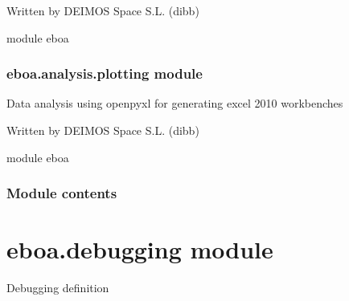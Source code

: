 Written by DEIMOS Space S.L. (dibb)

module eboa

\begin{fulllineitems}
\label{\detokenize{eboa.analysis:eboa.analysis.functions.adjust_column_width}}
\end{fulllineitems}



\subsubsection{eboa.analysis.plotting module}
\label{\detokenize{eboa.analysis:module-eboa.analysis.plotting}}\label{\detokenize{eboa.analysis:eboa-analysis-plotting-module}}
Data analysis using openpyxl for generating excel 2010 workbenches

Written by DEIMOS Space S.L. (dibb)

module eboa

\begin{fulllineitems}
\label{\detokenize{eboa.analysis:eboa.analysis.plotting.generate_gantt}}
\end{fulllineitems}



\subsubsection{Module contents}
\label{\detokenize{eboa.analysis:module-eboa.analysis}}\label{\detokenize{eboa.analysis:module-contents}}

\section{eboa.debugging module}
\label{\detokenize{eboa:module-eboa.debugging}}\label{\detokenize{eboa:eboa-debugging-module}}
Debugging definition

